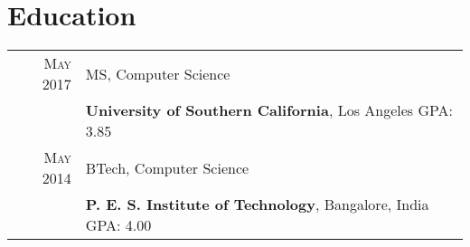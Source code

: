 \section{Education}
\begin{tabular}{rl}

\textsc{May 2017} & MS, Computer Science\\
&\textbf{University of Southern California}, Los Angeles\hspace{2.8cm} GPA: 3.85
\\
\textsc{May} 2014 & BTech, Computer Science\\
&\textbf{P. E. S. Institute of Technology}, Bangalore, India\hspace{2.4cm} GPA: 4.00

\end{tabular}
\vspace{5pt}
